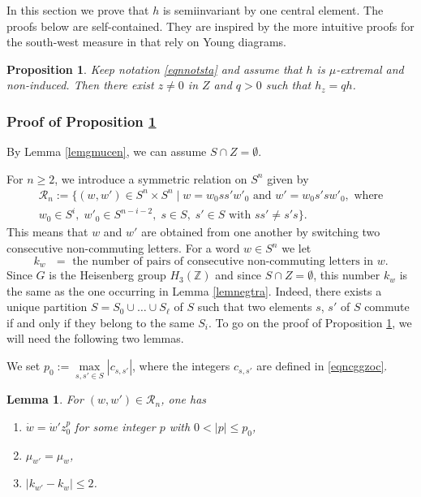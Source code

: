 \documentclass[JEP,XML,SOM,Unicode]{cedram}
\let\mathcal\mathscr
\newenvironment{enumeratei}
{\bgroup\def\theenumi{\roman{enumi}}\def\theenumii{\arabic{enumii}}\begin{enumerate}}
{\end{enumerate}\egroup}
\newtheorem{Prop}[Thm]{Proposition}
\newtheorem{Lem}[Thm]{Lemma}
\theoremstyle{definition}
\newcommand{\m}[1]{\mathbb{ #1}}
\newcommand{\mc}[1]{\mathcal{ #1}}
\let\bq\relax
\let\eq\relax
\begin{document}
\bq
In this section we prove that $h$
is semiinvariant by one central element.
The proofs below are self-contained.
They are inspired by the more intuitive
proofs for the south-west measure in \cite{BenoistHeisenberg1}
that rely on Young diagrams.
\eq

\begin{Prop}

\label{proseminv}
Keep notation \eqref{eqnnotsta} and
assume that $h$ is $\mu$-extremal and non-induced.
Then there exist $z\neq 0$ in $Z$ and $q>0$ such that $h_z=qh$.
\end{Prop}

\subsubsection*{Proof of Proposition \ref{proseminv}}
By Lemma \ref{lemgmucen}, we can assume $S\cap Z=\emptyset$.

For $n\geq 2$, we introduce a symmetric relation on $S^n$ given by
\begin{multline*}
\mc R_n:=\{ (w,w')\in S^n\times S^n \mid
w=w_0ss'w'_0\text{ and } w'=w_0s'sw'_0,\text{ where}\\
w_0\in S^i,\;w'_0\in S^{n-i-2},\; s\in S,\;s'\in S\text{ with } ss'\neq s's\}.
\end{multline*}
This means that $w$ and $w'$ are obtained from one another by switching two
consecutive non-commuting letters.
For a word $w\in S^n$ we let
\[
\text{$k_w$ $=$ the number of
pairs of consecutive non-commuting letters in $w$.}
\]
Since $G$ is the Heisenberg group $H_3(\m Z)$ and since $S\cap Z=\emptyset$,
this number
$k_w$ is the same as the one occurring in Lemma \ref{lemnegtra}.
Indeed, there exists a unique partition
$S=S_0\cup\ldots\cup S_\ell$ of $S$ such that two elements $s$, $s'$ of $S$
commute if and only if they belong to the same $S_i$.
To go on the proof of Proposition \ref{proseminv}, we will need the following two lemmas.

We set $p_0:=\max\limits_{s,s'\in S} |c_{s,s'}|$, where the integers $c_{s,s'}$
are defined in \eqref{eqncggzoc}.

\begin{Lem}
\label{lemkwkw}
For $(w,w')\in \mc R_n$, one has
\begin{enumeratei}
\item\label{lemkwkwi}
$\dot{w}=\dot{w}'z_0^p$ for some integer $p$ with $0<|p|\leq p_0$,
\item\label{lemkwkwii}
$\mu_{w'}=\mu_w$,
\item\label{lemkwkwiii}
$|k_{w'}-k_w|\leq 2$.
\end{enumeratei}
\end{Lem}
\end{document}
